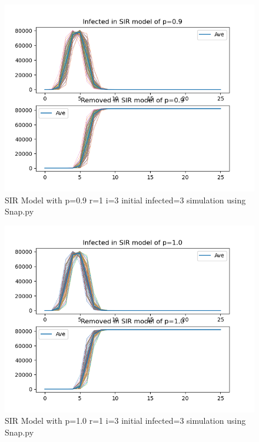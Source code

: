 \documentclass{subfile}
\begin{document}
  \begin{figure}
  \includegraphics[scale=0.8]{sirp09r1i3s3}
  \caption[SIR p=0.9,r=1,i=3,init infected=3]{SIR Model with p=0.9 r=1 i=3 initial infected=3 simulation using Snap.py}
  \end{figure}
  \begin{figure}
  \includegraphics[scale=0.8]{sirp10r1i3s3}
  \caption[SIR p=1.0,r=1,i=3,init infected=3]{SIR Model with p=1.0 r=1 i=3 initial infected=3 simulation using Snap.py}
  \end{figure}
\end{document}
